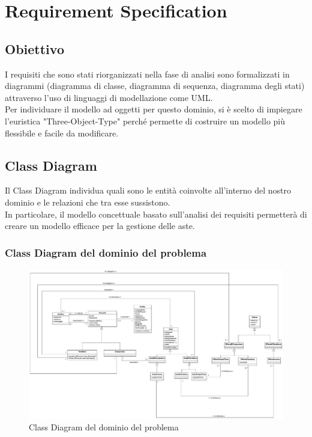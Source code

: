 
\chapter{Requirement Specification}
    \section{Obiettivo}
        I requisiti che sono stati riorganizzati nella fase di analisi sono formalizzati in diagrammi (diagramma di classe, diagramma di sequenza, diagramma degli stati) attraverso l'uso di linguaggi di modellazione come UML. \\
        Per individuare il modello ad oggetti per questo dominio, si è scelto di impiegare l'euristica "Three-Object-Type" perché permette di costruire un modello più flessibile e facile da modificare.

    \section{Class Diagram}
        Il Class Diagram individua quali sono le entità coinvolte all'interno del nostro dominio e le relazioni che tra esse sussistono.\\
        In particolare, il modello concettuale basato sull'analisi dei requisiti permetterà di creare un modello efficace per la gestione delle aste.\\
        
        \subsection{Class Diagram del dominio del problema}
            \begin{figure}[htbp!]
                \centering
                    \includegraphics[width=1\linewidth]{Immagini/Diagrammi/Class Diagram/Analisi/ClassDiagramDominio.pdf}
                \caption{Class Diagram del dominio del problema}
                \label{fig:Class Diagram del dominio del problema}
            \end{figure}
            
